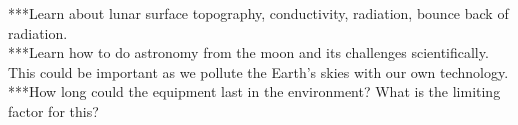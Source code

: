 ***Learn about lunar surface topography, conductivity, radiation, bounce back of radiation.\\
***Learn how to do astronomy from the moon and its challenges scientifically.  This could be important as we pollute the Earth's skies with our own technology.\\
***How long could the equipment last in the environment? What is the limiting factor for this?


